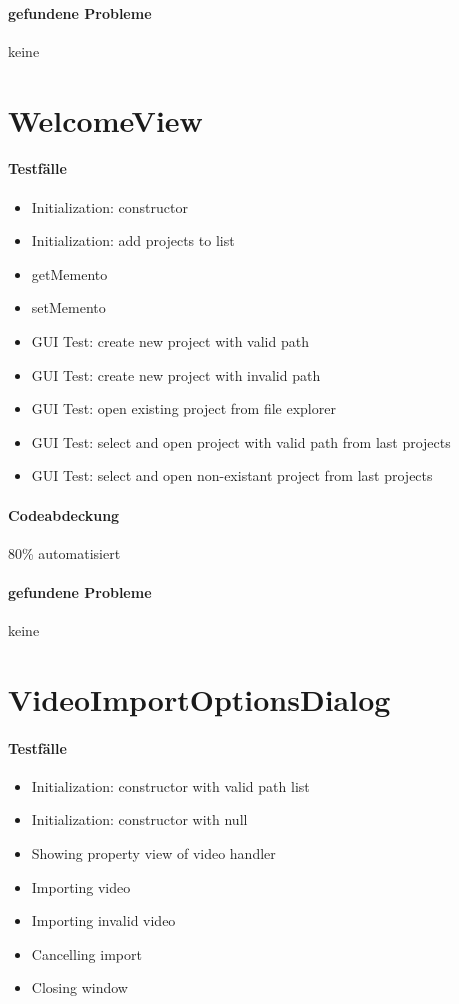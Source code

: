 \paragraph*{gefundene Probleme}
keine

\section{WelcomeView}
\paragraph*{Testfälle}
\begin{itemize}
\item Initialization: constructor
\item Initialization: add projects to list
\item getMemento
\item setMemento
\item GUI Test: create new project with valid path
\item GUI Test: create new project with invalid path
\item GUI Test: open existing project from file explorer
\item GUI Test: select and open project with valid path from last projects
\item GUI Test: select and open non-existant project from last projects
\end{itemize}

\paragraph*{Codeabdeckung}
80\% automatisiert

\paragraph*{gefundene Probleme}
keine

\section{VideoImportOptionsDialog}
\paragraph*{Testfälle}
\begin{itemize}
\item Initialization: constructor with valid path list
\item Initialization: constructor with null
\item Showing property view of video handler
\item Importing video
\item Importing invalid video
\item Cancelling import
\item Closing window
\end{itemize}

